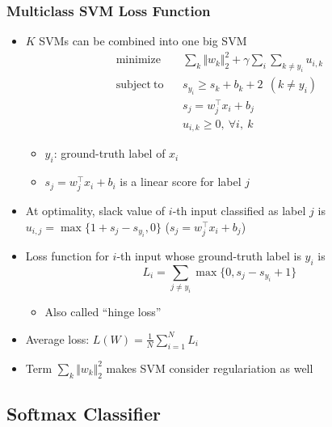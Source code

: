 \subsubsection*{Multiclass SVM Loss Function}
\begin{itemize}
    \item $K$ SVMs can be combined into one big SVM
    \begin{equation}\begin{aligned}
        \mathrm{minimize}~~&~~\sum_k\Vert w_k\Vert_2^2+\gamma\sum_{i}\sum_{k\neq y_i}u_{i,k} \\
        \mathrm{subject~to}~~&~~s_{y_i}\geq s_{k}+b_k+2~~(k\neq y_i)\\
            &~~s_j=w_j^{\top}x_i+b_j\\
            &~~u_{i,k}\geq 0,~\forall i,~k
    \end{aligned}\end{equation}
    \begin{itemize}
        \item $y_i$: ground-truth label of $x_i$
        \item $s_j=w_j^{\top}x_i+b_i$ is a linear score for label $j$
    \end{itemize}
    \item At optimality, slack value of $i$-th input classified as label $j$ is $u_{i,j}=\max\{1+s_j-s_{y_i},0\}$ ($s_j=w_j^{\top}x_i+b_j$)
    \item Loss function for $i$-th input whose ground-truth label is $y_i$ is
    \begin{equation}
        L_i=\sum_{j\neq y_i}\max\{0,s_j-s_{y_i}+1\}
    \end{equation}
    \begin{itemize}
        \item Also called ``hinge loss''
    \end{itemize}
    \begin{figures}
    \end{figures}
    \item Average loss: $L(W)=\frac{1}{N}\sum_{i=1}^NL_i$
    \item Term $\sum_k\Vert w_k\Vert_2^2$ makes SVM consider regulariation as well
\end{itemize}

\subsection{Softmax Classifier}

